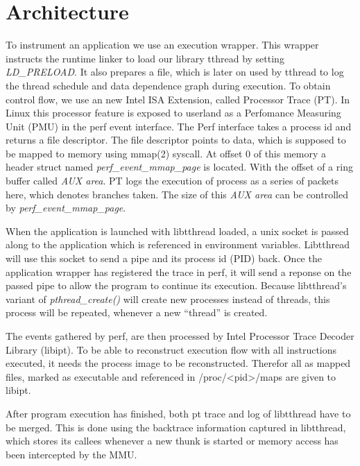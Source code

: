 \section{Architecture}
\label{sec:introduction}

To instrument an application we use an execution wrapper. This wrapper instructs
the runtime linker to load our library tthread by setting \emph{LD\_PRELOAD}. It
also prepares a file, which is later on used by tthread to log the thread
schedule and data dependence graph during execution. To obtain control flow, we
use an new Intel ISA Extension, called Processor Trace (PT). In Linux this
processor feature is exposed to userland as a Perfomance Measuring Unit (PMU) in
the perf event interface. The Perf interface takes a process id and returns a
file descriptor. The file descriptor points to data, which is supposed to be
mapped to memory using mmap(2) syscall. At offset 0 of this memory a header
struct named \emph{perf_event_mmap_page} is located.
With the offset of a ring buffer called \emph{AUX area}. PT logs the execution
of process as a series of packets here, which denotes branches taken.
The size of this \emph{AUX area} can be controlled by \emph{perf_event_mmap_page}.

When the application is launched with libtthread loaded,
a unix socket is passed along to the application which is referenced in environment variables.
Libtthread will use this socket to send a pipe and its process id (PID) back.
Once the application wrapper has registered the trace in perf,
it will send a reponse on the passed pipe to allow the program to continue its
execution. Because libtthread's variant of \emph{pthread\_create()} will create
new processes instead of threads, this process will be repeated, whenever a new
"`thread"' is created.

The events gathered by perf, are then processed by Intel Processor Trace Decoder
Library (libipt). To be able to reconstruct execution flow with all
instructions executed, it needs the process image to be reconstructed. Therefor
all as mapped files, marked as executable and referenced in /proc/<pid>/maps are
given to libipt.

After program execution has finished, both pt trace and log of libtthread have
to be merged. This is done using the backtrace information captured in
libtthread, which stores its callees whenever a new thunk is started or memory
access has been intercepted by the MMU.
